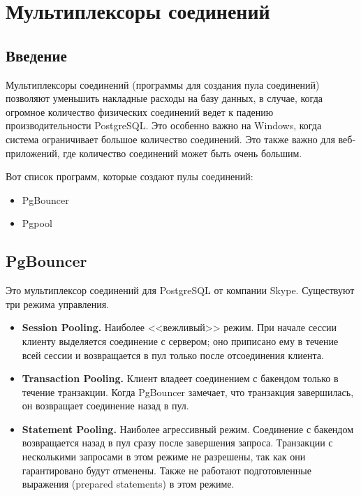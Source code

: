 \chapter{Мультиплексоры соединений}
\begin{epigraphs}
\end{epigraphs}
\section{Введение}
Мультиплексоры соединений (программы для создания пула соединений) позволяют уменьшить накладные расходы на базу данных, 
в случае, когда огромное количество физических соединений ведет к падению производительности PostgreSQL. 
Это особенно важно на Windows, когда система ограничивает большое количество соединений. 
Это также важно для веб-приложений, где количество соединений может быть очень большим.

Вот список программ, которые создают пулы соединений:
\begin{itemize}
\item PgBouncer
\item Pgpool
\end{itemize}

\section{PgBouncer}
Это мультиплексор соединений для PostgreSQL от компании Skype. Существуют три режима управления.
\begin{itemize}
\item \textbf{Session Pooling.}
Наиболее <<вежливый>> режим. При начале сессии клиенту выделяется соединение с сервером; 
оно приписано ему в течение всей сессии и возвращается в пул только после отсоединения клиента. 
\item \textbf{Transaction Pooling.} 
Клиент владеет соединением с бакендом только в течение транзакции. Когда PgBouncer замечает, 
что транзакция завершилась, он возвращает соединение назад в пул. 
\item \textbf{Statement Pooling.} 
Наиболее агрессивный режим. Соединение с бакендом возвращается назад в пул сразу после завершения 
запроса. Транзакции с несколькими запросами в этом режиме не разрешены, так как они гарантировано будут отменены.
Также не работают подготовленные выражения (prepared statements) в этом режиме.
\end{itemize}

